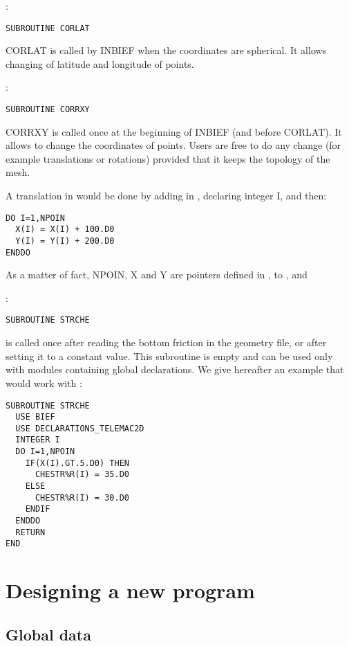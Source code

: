 :
\begin{lstlisting}[language=TelFortran]
SUBROUTINE CORLAT
\end{lstlisting}

CORLAT is called by INBIEF when the coordinates are spherical. It allows
changing of latitude and longitude of points.

:
\begin{lstlisting}[language=TelFortran]
SUBROUTINE CORRXY
\end{lstlisting}

CORRXY is called once at the beginning of INBIEF (and before CORLAT). It allows
to change the coordinates of points. Users are free to do any change (for
example translations or rotations) provided that it keeps the topology of the
mesh.

A translation in  would be done by adding  in , declaring integer I, and then:
\begin{lstlisting}[language=TelFortran]
DO I=1,NPOIN
  X(I) = X(I) + 100.D0
  Y(I) = Y(I) + 200.D0
ENDDO
\end{lstlisting}

As a matter of fact, NPOIN, X and Y are pointers defined in
, to , 
 and 

:
\begin{lstlisting}[language=TelFortran]
SUBROUTINE STRCHE
\end{lstlisting}

 is called once after reading the bottom friction in the
geometry file, or after setting it to a constant value. This subroutine is
empty and can be used only with modules containing global declarations. We give
hereafter an example that would work with :
\begin{lstlisting}[language=TelFortran]
SUBROUTINE STRCHE
  USE BIEF
  USE DECLARATIONS_TELEMAC2D
  INTEGER I
  DO I=1,NPOIN
    IF(X(I).GT.5.D0) THEN
      CHESTR%R(I) = 35.D0
    ELSE
      CHESTR%R(I) = 30.D0
    ENDIF
  ENDDO
  RETURN
END
\end{lstlisting}

\section{Designing a new program}

\subsection{Global data}


